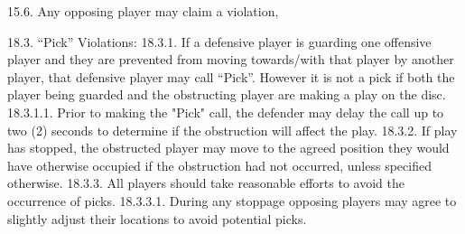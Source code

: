 15.6. Any opposing player may claim a violation,

18.3. “Pick” Violations:
18.3.1. If a defensive player is guarding one offensive player and they are prevented from moving
towards/with that player by another player, that defensive player may call “Pick”. However it is
not a pick if both the player being guarded and the obstructing player are making a play on the
disc.
18.3.1.1. Prior to making the "Pick" call, the defender may delay the call up to two (2) seconds to
determine if the obstruction will affect the play.
18.3.2. If play has stopped, the obstructed player may move to the agreed position they would have
otherwise occupied if the obstruction had not occurred, unless specified otherwise.
18.3.3. All players should take reasonable efforts to avoid the occurrence of picks.
18.3.3.1. During any stoppage opposing players may agree to slightly adjust their locations to avoid
potential picks.
